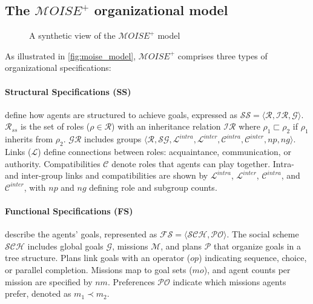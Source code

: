 \documentclass[sigconf,anonymous]{aamas}
\begin{document}

\subsection{The $\mathcal{M}OISE^+$ organizational model}

\begin{figure}[h!]
    
    \caption{A synthetic view of the $\mathcal{M}OISE^+$ model}
    \label{fig:moise_model}
\end{figure}

As illustrated in \autoref{fig:moise_model}, $\mathcal{M}OISE^+$ comprises three types of organizational specifications:

\noindent \paragraph{\textbf{Structural Specifications (SS)}} define how agents are structured to achieve goals, expressed as $\mathcal{SS} = \langle \mathcal{R}, \mathcal{IR}, \mathcal{G} \rangle$. $\mathcal{R}_{ss}$ is the set of roles ($\rho \in \mathcal{R}$) with an inheritance relation $\mathcal{IR}$ where $\rho_1 \sqsubset \rho_2$ if $\rho_1$ inherits from $\rho_2$. $\mathcal{GR}$ includes groups $\langle \mathcal{R}, \mathcal{SG}, \mathcal{L}^{intra}, \mathcal{L}^{inter}, \allowbreak \mathcal{C}^{intra}, \mathcal{C}^{inter}, np, ng \rangle$. Links ($\mathcal{L}$) define connections between roles: acquaintance, communication, or authority. Compatibilities $\mathcal{C}$ denote roles that agents can play together. Intra- and inter-group links and compatibilities are shown by $\mathcal{L}^{intra}$, $\mathcal{L}^{inter}$, $\mathcal{C}^{intra}$, and $\mathcal{C}^{inter}$, with $np$ and $ng$ defining role and subgroup counts.

\noindent \paragraph{\textbf{Functional Specifications (FS)}} describe the agents' goals, represented as $\mathcal{FS} = \langle \mathcal{SCH}, \mathcal{PO} \rangle$. The social scheme $\mathcal{SCH}$ includes global goals $\mathcal{G}$, missions $\mathcal{M}$, and plans $\mathcal{P}$ that organize goals in a tree structure. Plans link goals with an operator ($op$) indicating sequence, choice, or parallel completion. Missions map to goal sets ($mo$), and agent counts per mission are specified by $nm$. Preferences $\mathcal{PO}$ indicate which missions agents prefer, denoted as $m_1 \prec m_2$.
\end{document}
